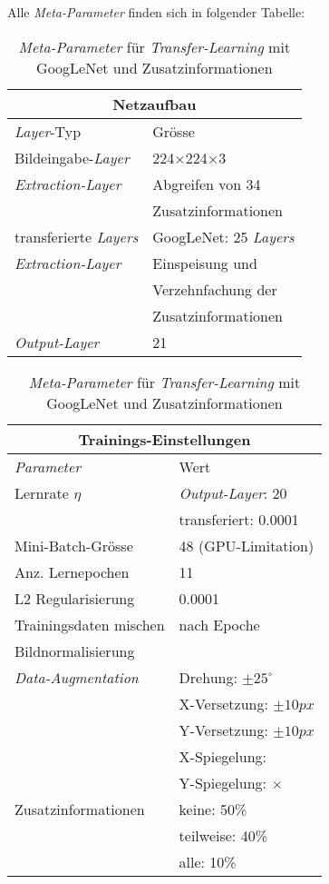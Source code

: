 Alle \textit{Meta-Parameter} finden sich in folgender Tabelle:

\begin{table}[!htb]
	\def\arraystretch{1.4}
	\centering
	\begin{subtable}[t]{.5\linewidth}
		\begin{tabular}[t]{l | l }
			\multicolumn{2}{c}{\textbf{Netzaufbau}}\\
			\hline
			\textit{Layer}-Typ & Grösse\\
			\hline
			\hline
			Bildeingabe-\textit{Layer} & 224$\times$224$\times$3\\
			\hline
			\textit{Extraction-Layer} & Abgreifen von 34 \\
			  & Zusatzinformationen\\
			\hline
			transferierte \textit{Layers}& GoogLeNet: 25 \textit{Layers}\\\hline
			\textit{Extraction-Layer} & Einspeisung und\\
			& Verzehnfachung der\\
			& Zusatzinformationen\\
			\hline
			\textit{Output-Layer}   & 21\\
		\end{tabular}
	\end{subtable}%
	\begin{subtable}[t]{.5\linewidth}
		\begin{tabular}[t]{l | l }
		\multicolumn{2}{c}{\textbf{Trainings-Einstellungen}}\\
		\hline
		\textit{Parameter} & Wert\\
		\hline
		\hline
		Lernrate $\eta$ & \textit{Output-Layer}: 20 \\
		& transferiert: 0.0001\\
		Mini-Batch-Grösse & 48 (GPU-Limitation)\\
		Anz. Lernepochen & 11\\
		L2 Regularisierung & 0.0001\\
		Trainingsdaten mischen& nach Epoche\\
		Bildnormalisierung & \checkmark\\
		\textit{Data-Augmentation}& Drehung: $\pm25^{\circ}$ \\
		& X-Versetzung: $\pm10px$ \\
		& Y-Versetzung: $\pm10px$ \\
		& X-Spiegelung: \checkmark \\
		& Y-Spiegelung: $\times$ \\
		Zusatzinformationen & keine: 50\%\\
							 &teilweise: 40\%\\
							 &alle: 10\%
		\end{tabular}
	\end{subtable} 
	\caption[]{\textit{Meta-Parameter} für \textit{Transfer-Learning} mit GoogLeNet und Zusatzinformationen}
	\label{table:extra_transfer}
\end{table}

